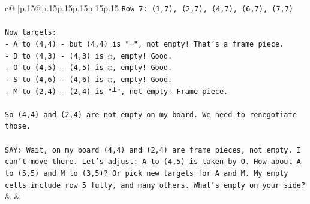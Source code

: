 \documentclass{article}
\begin{document}
{\begin{supertabular}{c@{$\;$}|p{.15\linewidth}@{}p{.15\linewidth}p{.15\linewidth}p{.15\linewidth}p{.15\linewidth}p{.15\linewidth}}
{{{\texttt{Row 7: (1,7), (2,7), (4,7), (6,7), (7,7)} \\
\\ 
\texttt{Now targets:} \\
\texttt{{-} A to (4,4) {-} but (4,4) is "─", not empty! That's a frame piece.} \\
\texttt{{-} D to (4,3) {-} (4,3) is ◌, empty! Good.} \\
\texttt{{-} O to (4,5) {-} (4,5) is ◌, empty! Good.} \\
\texttt{{-} S to (4,6) {-} (4,6) is ◌, empty! Good.} \\
\texttt{{-} M to (2,4) {-} (2,4) is "┴", not empty! Frame piece.} \\
\\ 
\texttt{So (4,4) and (2,4) are not empty on my board. We need to renegotiate those.} \\
\\ 
\texttt{SAY: Wait, on my board (4,4) and (2,4) are frame pieces, not empty. I can't move there. Let's adjust: A to (4,5) is taken by O. How about A to (5,5) and M to (3,5)? Or pick new targets for A and M. My empty cells include row 5 fully, and many others. What's empty on your side?} \\
            }
        }
    }
    & & \\ \\


\end{supertabular}}
\end{document}
